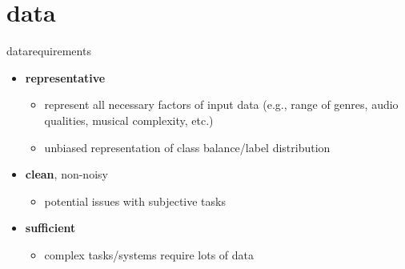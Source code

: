     \section{data}
        \begin{frame}{data}{requirements}
          
            \begin{itemize}
                \item   \textbf{representative}
                    \begin{itemize}
                        \item   represent all necessary factors of input data (e.g., range of genres, audio qualities, musical complexity, etc.)
                        \item   unbiased representation of class balance/label distribution
                    \end{itemize}
                \smallskip
                \item   \textbf{clean}, non-noisy
                    \begin{itemize}
                        \item   potential issues with subjective tasks
                    \end{itemize}
                \smallskip
                \item   \textbf{sufficient}
                    \begin{itemize}
                        \item   complex tasks/systems require lots of data
                    \end{itemize}
            \end{itemize}
        \end{frame}
        
